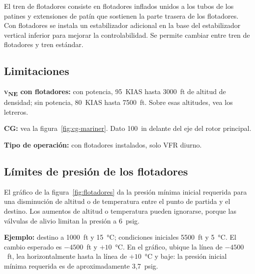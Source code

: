El tren de flotadores consiste en flotadores inflados unidos a los tubos de los patines y extensiones de patín que sostienen la parte trasera de los flotadores. Con flotadores se instala un estabilizador adicional en la base del estabilizador vertical inferior para mejorar la controlabilidad. Se permite cambiar entre tren de flotadores y tren estándar.

\subsection{Limitaciones}

\textbf{\textsc{v}\textsubscript{NE} con flotadores:} con potencia, 95~KIAS hasta 3000~ft de altitud de densidad; sin potencia, 80~KIAS hasta 7500~ft. Sobre esas altitudes, vea los letreros.

\textbf{CG:} vea la figura~\ref{fig:cg-mariner}. Dato 100~in delante del eje del rotor principal.

\textbf{Tipo de operación:} con flotadores instalados, solo VFR diurno.



\subsection{Límites de presión de los flotadores}

\begin{checklist}
\end{checklist}

El gráfico de la figura~\ref{fig:flotadores} da la presión mínima inicial requerida para una disminución de altitud o de temperatura entre el punto de partida y el destino. Los aumentos de altitud o temperatura pueden ignorarse, porque las válvulas de alivio limitan la presión a 6~psig.

\textbf{Ejemplo:} destino a 1000~ft y 15~°C; condiciones iniciales 5500~ft y 5~°C. El cambio esperado es $-4500$~ft y $+10$~°C. En el gráfico, ubique la línea de $-4500$~ft, lea horizontalmente hasta la línea de $+10$~°C y baje: la presión inicial mínima requerida es de aproximadamente 3,7~psig.

